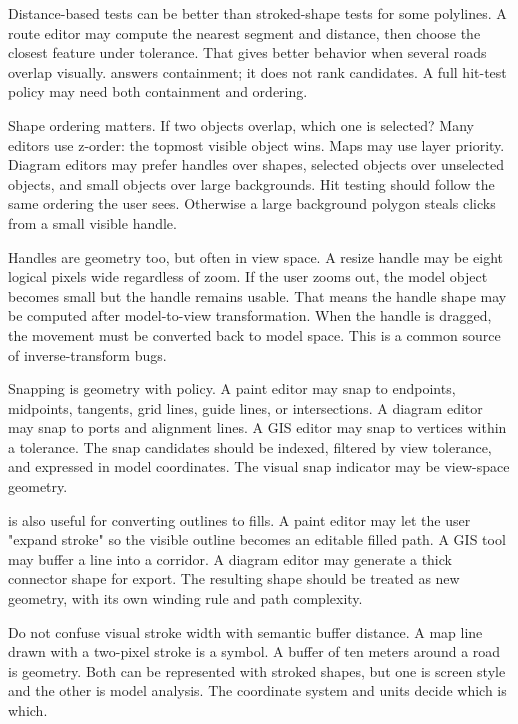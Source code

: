 Distance-based tests can be better than stroked-shape tests for some polylines. A route editor may compute the nearest segment and distance, then choose the closest feature under tolerance. That gives better behavior when several roads overlap visually.  answers containment; it does not rank candidates. A full hit-test policy may need both containment and ordering.

Shape ordering matters. If two objects overlap, which one is selected? Many editors use z-order: the topmost visible object wins. Maps may use layer priority. Diagram editors may prefer handles over shapes, selected objects over unselected objects, and small objects over large backgrounds. Hit testing should follow the same ordering the user sees. Otherwise a large background polygon steals clicks from a small visible handle.

Handles are geometry too, but often in view space. A resize handle may be eight logical pixels wide regardless of zoom. If the user zooms out, the model object becomes small but the handle remains usable. That means the handle shape may be computed after model-to-view transformation. When the handle is dragged, the movement must be converted back to model space. This is a common source of inverse-transform bugs.

Snapping is geometry with policy. A paint editor may snap to endpoints, midpoints, tangents, grid lines, guide lines, or intersections. A diagram editor may snap to ports and alignment lines. A GIS editor may snap to vertices within a tolerance. The snap candidates should be indexed, filtered by view tolerance, and expressed in model coordinates. The visual snap indicator may be view-space geometry.

 is also useful for converting outlines to fills. A paint editor may let the user "expand stroke" so the visible outline becomes an editable filled path. A GIS tool may buffer a line into a corridor. A diagram editor may generate a thick connector shape for export. The resulting shape should be treated as new geometry, with its own winding rule and path complexity.

Do not confuse visual stroke width with semantic buffer distance. A map line drawn with a two-pixel stroke is a symbol. A buffer of ten meters around a road is geometry. Both can be represented with stroked shapes, but one is screen style and the other is model analysis. The coordinate system and units decide which is which.

